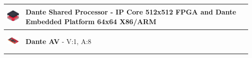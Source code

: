 \begin{center}
\begin{tabular}{|c|p{10cm}|}
		\hline
		\includegraphics[width=40px,height=40px,keepaspectratio]{figures/shared-processor.jpg} & \textbf{Dante Shared Processor} - IP Core 512x512 FPGA and Dante Embedded Platform 64x64 X86/ARM \\
		\hline
		\includegraphics[width=40px,height=40px,keepaspectratio]{figures/dante-av.jpg} & \textbf{Dante AV} - V:1, A:8 \\
		\hline
	\end{tabular}
\end{center}
	





